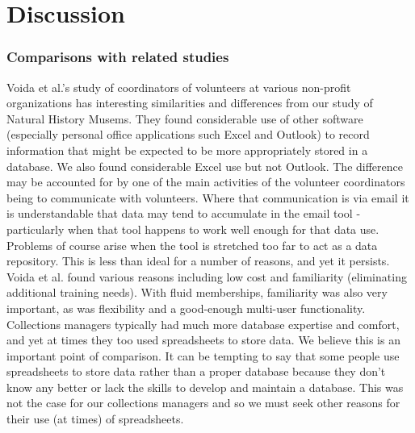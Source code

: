 \section{Discussion}
\subsubsection{Comparisons with related studies}
  
Voida et al.'s study of coordinators of volunteers at various non-profit organizations \cite{voida2011homebrew} has interesting similarities and differences from our study of Natural History Musems. They found considerable use of other software (especially personal office applications such Excel and Outlook) to record information that might be expected to be more appropriately stored in a database. We also found considerable Excel use but not Outlook. The difference may be accounted for by one of the main activities of the volunteer coordinators being to communicate with volunteers. Where that communication is via email it is understandable that data may tend to accumulate in the email tool - particularly when that tool happens to work well enough for that data use. Problems of course arise when the tool is stretched too far to act as a data repository. This is less than ideal for a number of reasons, and yet it persists. Voida et al. found various reasons including low cost and familiarity (eliminating additional training needs). With fluid memberships, familiarity was also very important, as was flexibility and a good-enough multi-user functionality. Collections managers typically had much more database expertise and comfort, and yet at times they too used spreadsheets to store data. We believe this is an important point of comparison. It can be tempting to say that some people use spreadsheets to store data rather than a proper database because they don't know any better or lack the skills to develop and maintain a database. This was not the case for our collections managers and so we must seek other reasons for their use (at times) of spreadsheets.

